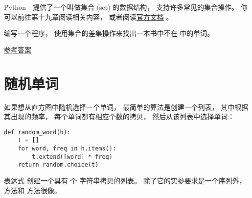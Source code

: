 \begin{exercise}

Python　提供了一个叫做集合 (set) 的数据结构， 支持许多常见的集合操作。  
你可以前往第十九章阅读相关内容， 或者阅读\href{http://docs.python.org/3/library/stdtypes.html#types-set}{官方文档} 。  

编写一个程序， 使用集合的差集操作来找出一本书中不在  中的单词。  

\href{http://thinkpython2.com/code/analyze_book2.py}{参考答案}

\end{exercise}

\section{随机单词}
\label{randomwords}


如果想从直方图中随机选择一个单词， 最简单的算法是创建一个列表， 
其中根据其出现的频率， 每个单词都有相应个数的拷贝， 然后从该列表中选择单词：

\begin{lstlisting}
def random_word(h):
    t = []
    for word, freq in h.items():
        t.extend([word] * freq)
    return random.choice(t)
\end{lstlisting}


表达式  创建一个具有  个  字符串拷贝的列表。  
除了它的实参要求是一个序列外，  方法和  方法很像。  


